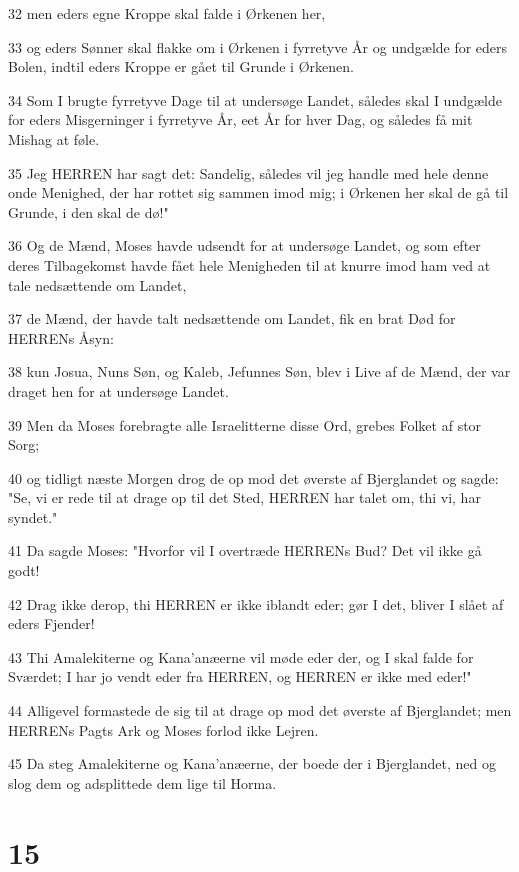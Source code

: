 \par 32 men eders egne Kroppe skal falde i Ørkenen her,
\par 33 og eders Sønner skal flakke om i Ørkenen i fyrretyve År og undgælde for eders Bolen, indtil eders Kroppe er gået til Grunde i Ørkenen.
\par 34 Som I brugte fyrretyve Dage til at undersøge Landet, således skal I undgælde for eders Misgerninger i fyrretyve År, eet År for hver Dag, og således få mit Mishag at føle.
\par 35 Jeg HERREN har sagt det: Sandelig, således vil jeg handle med hele denne onde Menighed, der har rottet sig sammen imod mig; i Ørkenen her skal de gå til Grunde, i den skal de dø!"
\par 36 Og de Mænd, Moses havde udsendt for at undersøge Landet, og som efter deres Tilbagekomst havde fået hele Menigheden til at knurre imod ham ved at tale nedsættende om Landet,
\par 37 de Mænd, der havde talt nedsættende om Landet, fik en brat Død for HERRENs Åsyn:
\par 38 kun Josua, Nuns Søn, og Kaleb, Jefunnes Søn, blev i Live af de Mænd, der var draget hen for at undersøge Landet.
\par 39 Men da Moses forebragte alle Israelitterne disse Ord, grebes Folket af stor Sorg;
\par 40 og tidligt næste Morgen drog de op mod det øverste af Bjerglandet og sagde: "Se, vi er rede til at drage op til det Sted, HERREN har talet om, thi vi, har syndet."
\par 41 Da sagde Moses: "Hvorfor vil I overtræde HERRENs Bud? Det vil ikke gå godt!
\par 42 Drag ikke derop, thi HERREN er ikke iblandt eder; gør I det, bliver I slået af eders Fjender!
\par 43 Thi Amalekiterne og Kana'anæerne vil møde eder der, og I skal falde for Sværdet; I har jo vendt eder fra HERREN, og HERREN er ikke med eder!"
\par 44 Alligevel formastede de sig til at drage op mod det øverste af Bjerglandet; men HERRENs Pagts Ark og Moses forlod ikke Lejren.
\par 45 Da steg Amalekiterne og Kana'anæerne, der boede der i Bjerglandet, ned og slog dem og adsplittede dem lige til Horma.

\chapter{15}


